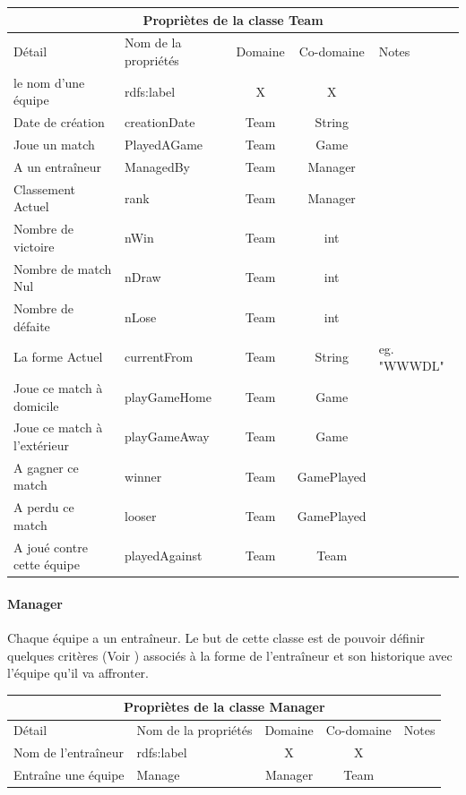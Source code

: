 \documentclass[oneside,13pt,a4paper]{article}
\begin{document}
\begin{tabular}{| l | l | c | c | p{3cm} |}
  \hline
  \multicolumn{5}{|c|}{Propriètes de la classe \textbf{Team}} \\ \hline
  Détail & Nom de la propriétés & Domaine & Co-domaine & Notes \\ \hline
  le nom d'une équipe & rdfs:label  & X & X &  \\ \hline
  Date de création & creationDate & Team & String &  \\ \hline
  Joue un match & PlayedAGame & Team & Game &  \\ \hline
  A un entraîneur & ManagedBy & Team  & Manager &  \\ \hline
  Classement Actuel & rank  & Team & Manager &  \\ \hline
  Nombre de victoire & nWin & Team & int &  \\ \hline
  Nombre de match Nul & nDraw & Team & int &  \\ \hline
  Nombre de défaite & nLose & Team & int &  \\ \hline
  La forme Actuel & currentFrom & Team & String & eg. "WWWDL" \\ \hline
  Joue ce match à domicile & playGameHome & Team & Game & \\ \hline
  Joue ce match à l'extérieur & playGameAway & Team & Game & \\ \hline
  A gagner ce match & winner & Team & GamePlayed & \\ \hline
  A perdu ce match & looser & Team & GamePlayed & \\ \hline
  A joué contre cette équipe & playedAgainst & Team & Team & \\
  \hline
\end{tabular}

\paragraph{Manager}

Chaque équipe a un entraîneur. Le but de cette classe est de pouvoir définir quelques critères (Voir ) associés à la forme de l’entraîneur et son historique avec l’équipe qu’il va affronter.

\begin{tabular}{| l | l | c | c | p{3cm} |}
  \hline
  \multicolumn{5}{|c|}{Propriètes de la classe \textbf{Manager}} \\ \hline
  Détail & Nom de la propriétés & Domaine & Co-domaine & Notes \\ \hline
  Nom de l'entraîneur & rdfs:label & X  & X  &  \\ \hline
  Entraîne une équipe & Manage & Manager & Team &  \\
\hline
\end{tabular}
\end{document}
